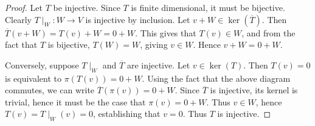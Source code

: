 \documentclass[9pt,twoside,openany]{memoir}
\theoremstyle{plain}
\theoremstyle{definition}
\theoremstyle{remark}
\numberwithin{equation}{section}
\begin{document}
\begin{proof}
            Let $T$ be injective. Since $T$ is finite dimensional, it must be bijective. Clearly $T\mid_W:W \rightarrow V$ is injective by inclusion. Let $v+W \in \ker{(\overline{T})}$. Then $\overline{T}(v+W) = T(v)+W = 0+W$. This gives that $T(v) \in W$, and from the fact that $T$ is bijective, $T(W) = W$, giving $v \in W$. Hence $v+W = 0+W$.

            Conversely, suppose $T\mid_W$ and $\overline{T}$ are injective. Let $v \in \ker{(T)}$. Then $T(v) = 0$ is equivalent to $\pi(T(v)) = 0 + W$. Using the fact that the above diagram commutes, we can write $\overline{T}(\pi(v)) = 0 + W$. Since $\overline{T}$ is injective, its kernel is trivial, hence it must be the case that $\pi(v) = 0 +W$. Thus $v \in W$, hence $T(v) = T\mid_W (v) = 0$, establishing that $v= 0$. Thus $T$ is injective.
        \end{proof}
\end{document}
